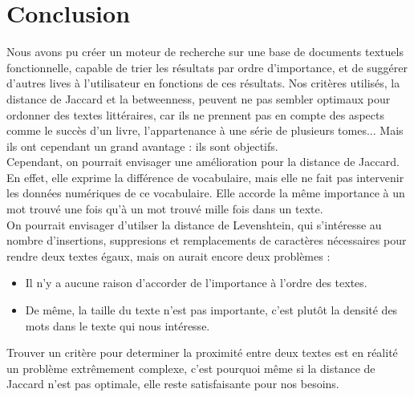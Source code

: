 \documentclass{article}
\begin{document}
\section*{Conclusion}

Nous avons pu créer un moteur de recherche sur une base de documents textuels fonctionnelle, capable de trier les résultats par ordre d'importance, et de suggérer d'autres lives à l'utilisateur en fonctions de ces résultats. Nos critères utilisés, la distance de Jaccard et la betweenness, peuvent ne pas sembler optimaux pour ordonner des textes littéraires, car ils ne prennent pas en compte des aspects comme le succès d'un livre, l'appartenance à une série de plusieurs tomes... Mais ils ont cependant un grand avantage : ils sont objectifs.\\
Cependant, on pourrait envisager une amélioration pour la distance de Jaccard. En effet, elle exprime la différence de vocabulaire, mais elle ne fait pas intervenir les données numériques de ce vocabulaire. Elle accorde la même importance à un mot trouvé une fois qu'à un mot trouvé mille fois dans un texte.\\

On pourrait envisager d'utilser la distance de Levenshtein, qui s'intéresse au nombre d'insertions, suppresions et remplacements de caractères nécessaires pour rendre deux textes égaux, mais on aurait encore deux problèmes :\\

\begin{itemize}
\item Il n'y a aucune raison d'accorder de l'importance à l'ordre des textes.
\item De même, la taille du texte n'est pas importante, c'est plutôt la densité des mots dans le texte qui nous intéresse.\\
\end{itemize}

Trouver un critère pour determiner la proximité entre deux textes est en réalité un problème extrêmement complexe, c'est pourquoi même si la distance de Jaccard n'est pas optimale, elle reste satisfaisante pour nos besoins.


{}


\newpage

\tableofcontents
{}
\end{document}
